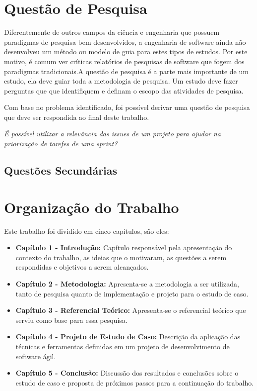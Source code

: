 \section{Questão de Pesquisa}

Diferentemente de outros campos da ciência e engenharia que possuem paradigmas de
pesquisa bem desenvolvidos, a engenharia de software ainda não desenvolveu um
método ou modelo de guia para estes tipos de estudos. Por este motivo, é
comum ver críticas relatórios de pesquisas de software que fogem dos paradigmas
tradicionais\cite{shaw}.A questão de pesquisa é a parte mais importante de um estudo, ela deve guiar toda
a metodologia de pesquisa. Um estudo deve fazer perguntas que que identifiquem e
definam o escopo das atividades de pesquisa\cite{guidelines}.

Com base no problema identificado, foi possível derivar uma questão de pesquisa
que deve ser respondida ao final deste trabalho.

\begin{center}
    \textit{É possível utilizar a relevância das issues de um projeto para ajudar
    na priorização de tarefes de uma sprint?}
\end{center}

\subsection{Questões Secundárias}


\section{Organização do Trabalho}
Este trabalho foi dividido em cinco capítulos, são eles:

\begin{itemize}
    \item \textbf{Capítulo 1 - Introdução:} Capítulo responsável pela apresentação do contexto do trabalho, as ideias que o motivaram, as questões a serem respondidas e objetivos a serem alcançados.
    \item \textbf{Capítulo 2 - Metodologia:} Apresenta-se a metodologia a ser utilizada, tanto de pesquisa quanto de implementação e projeto para o estudo de caso.
    \item \textbf{Capítulo 3 - Referencial Teórico:} Apresenta-se o referencial teórico que serviu como base para essa pesquisa.
    \item \textbf{Capítulo 4 - Projeto de Estudo de Caso:} Descrição da aplicação das técnicas e ferramentas definidas em um projeto de desenvolvimento de software ágil.
    \item \textbf{Capítulo 5 - Conclusão:} Discussão dos resultados e conclusões sobre o estudo de caso e proposta de próximos passos para a continuação do trabalho.
\end{itemize}
